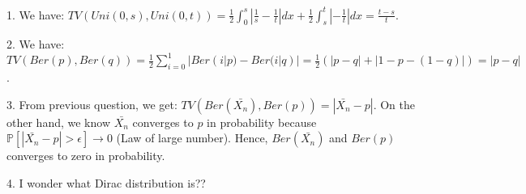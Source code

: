 \documentclass[10pt]{article}
\newenvironment{problem}[2][Problem]{\begin{trivlist}
\item[\hskip \labelsep {\bfseries #1}\hskip \labelsep {\bfseries #2.}]}{\end{trivlist}}
\begin{document}
\begin{problem}{4}
\item 1.
We have: $TV(Uni(0,s), Uni(0,t))=\frac{1}{2}\int_{0}^{s}|\frac{1}{s}-\frac{1}{t}|dx + \frac{1}{2}\int_{s}^{t}|-\frac{1}{t}|dx=\frac{t-s}{t}$.\\
\item 2.
We have: $TV(Ber(p), Ber(q))=\frac{1}{2}\sum_{i=0}^{1}|Ber(i|p)-Ber(i|q)|=\frac{1}{2}(|p-q|+|1-p-(1-q)|)=|p-q|$.\\
\item 3.
From previous question, we get: $TV(Ber(\bar{X_n}), Ber(p))=|\bar{X_n}-p|$. On the other hand, we know $\bar{X_n}$ converges to $p$ in probability because $\mathbb{P}[|\bar{X_n}-p|>\epsilon] \longrightarrow 0$ (Law of large number). Hence, $Ber(\bar{X_n})$ and $Ber(p)$ converges to zero in probability.
\item 4. I wonder what Dirac distribution is??
\end{problem}
\end{document}
